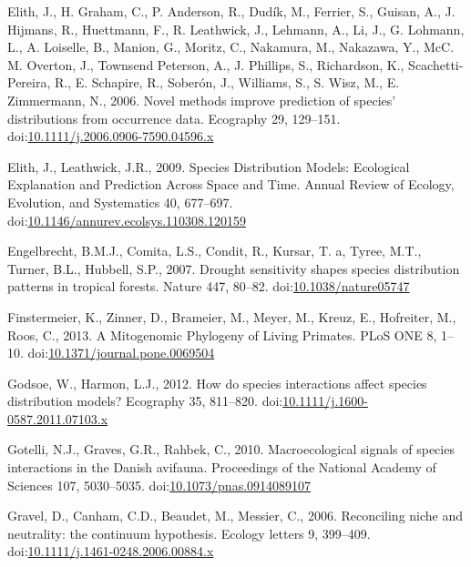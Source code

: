 \hypertarget{ref-Elith2006}{}
Elith, J., H. Graham, C., P. Anderson, R., Dudík, M., Ferrier, S.,
Guisan, A., J. Hijmans, R., Huettmann, F., R. Leathwick, J., Lehmann,
A., Li, J., G. Lohmann, L., A. Loiselle, B., Manion, G., Moritz, C.,
Nakamura, M., Nakazawa, Y., McC. M. Overton, J., Townsend Peterson, A.,
J. Phillips, S., Richardson, K., Scachetti-Pereira, R., E. Schapire, R.,
Soberón, J., Williams, S., S. Wisz, M., E. Zimmermann, N., 2006. Novel
methods improve prediction of species' distributions from occurrence
data. Ecography 29, 129--151.
doi:\href{https://doi.org/10.1111/j.2006.0906-7590.04596.x}{10.1111/j.2006.0906-7590.04596.x}

\hypertarget{ref-Elith2009a}{}
Elith, J., Leathwick, J.R., 2009. Species Distribution Models:
Ecological Explanation and Prediction Across Space and Time. Annual
Review of Ecology, Evolution, and Systematics 40, 677--697.
doi:\href{https://doi.org/10.1146/annurev.ecolsys.110308.120159}{10.1146/annurev.ecolsys.110308.120159}

\hypertarget{ref-Engelbrecht2007}{}
Engelbrecht, B.M.J., Comita, L.S., Condit, R., Kursar, T. a, Tyree,
M.T., Turner, B.L., Hubbell, S.P., 2007. Drought sensitivity shapes
species distribution patterns in tropical forests. Nature 447, 80--82.
doi:\href{https://doi.org/10.1038/nature05747}{10.1038/nature05747}

\hypertarget{ref-Finstermeier2013}{}
Finstermeier, K., Zinner, D., Brameier, M., Meyer, M., Kreuz, E.,
Hofreiter, M., Roos, C., 2013. A Mitogenomic Phylogeny of Living
Primates. PLoS ONE 8, 1--10.
doi:\href{https://doi.org/10.1371/journal.pone.0069504}{10.1371/journal.pone.0069504}

\hypertarget{ref-Godsoe2012}{}
Godsoe, W., Harmon, L.J., 2012. How do species interactions affect
species distribution models? Ecography 35, 811--820.
doi:\href{https://doi.org/10.1111/j.1600-0587.2011.07103.x}{10.1111/j.1600-0587.2011.07103.x}

\hypertarget{ref-Gotelli2010}{}
Gotelli, N.J., Graves, G.R., Rahbek, C., 2010. Macroecological signals
of species interactions in the Danish avifauna. Proceedings of the
National Academy of Sciences 107, 5030--5035.
doi:\href{https://doi.org/10.1073/pnas.0914089107}{10.1073/pnas.0914089107}

\hypertarget{ref-Gravel2006a}{}
Gravel, D., Canham, C.D., Beaudet, M., Messier, C., 2006. Reconciling
niche and neutrality: the continuum hypothesis. Ecology letters 9,
399--409.
doi:\href{https://doi.org/10.1111/j.1461-0248.2006.00884.x}{10.1111/j.1461-0248.2006.00884.x}

